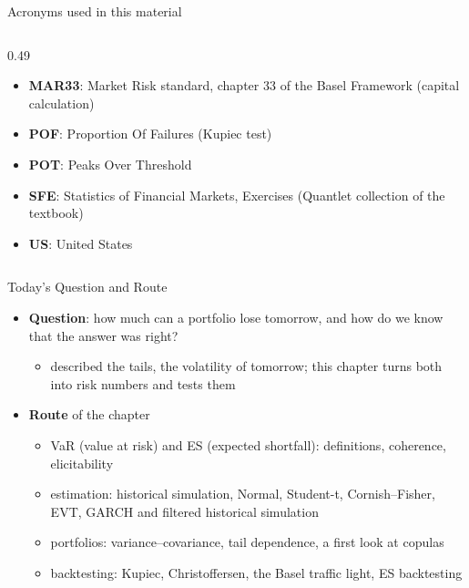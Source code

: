 \begin{frame}{Acronyms used in this material}
\begin{columns}[T]
\begin{column}{0.49\textwidth}
\begin{itemize}
    \item \textbf{MAR33}: Market Risk standard, chapter 33 of the Basel Framework (capital calculation)
    \item \textbf{POF}: Proportion Of Failures (Kupiec test)
    \item \textbf{POT}: Peaks Over Threshold
    \item \textbf{SFE}: Statistics of Financial Markets, Exercises (Quantlet collection of the textbook)
    \item \textbf{US}: United States
\end{itemize}
\end{column}
\end{columns}
\end{frame}

\begin{frame}{Today's Question and Route}
\itemsize{\small}
\begin{itemize}
    \item \textbf{Question}: how much can a portfolio lose tomorrow, and how do we know that the answer was right?
    \begin{itemize}
        \item {} described the tails,  the volatility of tomorrow; this chapter turns both into risk numbers and tests them
    \end{itemize}
    \item \textbf{Route} of the chapter
    \begin{itemize}
        \item VaR (value at risk) and ES (expected shortfall): definitions, coherence, elicitability
        \item estimation: historical simulation, Normal, Student-t, Cornish--Fisher, EVT, GARCH and filtered historical simulation
        \item portfolios: variance--covariance, tail dependence, a first look at copulas
        \item backtesting: Kupiec, Christoffersen, the Basel traffic light, ES backtesting
    \end{itemize}
\end{itemize}
\end{frame}

